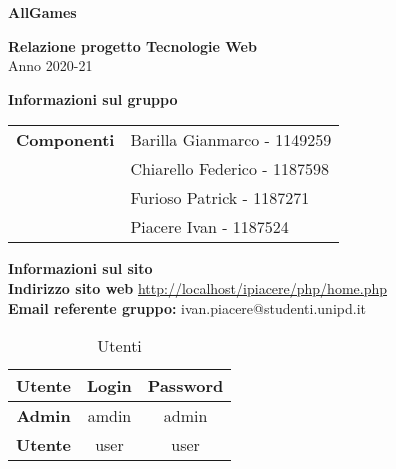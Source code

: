 \begin{center}
	\textbf{\Huge{AllGames}}\\
	\vspace{15pt}
\end{center}

\vspace{1.5cm}

\begin{center}
	\textbf{\huge{Relazione progetto Tecnologie Web}}\\[0.2cm]
	\Large{Anno 2020-21}
\end{center}

\vspace{5pt}

\begin{center}
	\textbf{\Large{Informazioni sul gruppo}}
\begin{table}[H]
	\hspace{3.5cm}
	\renewcommand{\arraystretch}{1.4}
	\begin{tabular}{l | l}
		\textbf{Componenti} & Barilla Gianmarco - 1149259\\
		& Chiarello Federico - 1187598\\
		& Furioso Patrick - 1187271\\
		& Piacere Ivan - 1187524\\
	\end{tabular}
\end{table}
\end{center}

\hspace{5pt}

\begin{center}
	\textbf{\Large{Informazioni sul sito}}\\
	\textbf{Indirizzo sito web} \url{http://localhost/ipiacere/php/home.php}\\
	\textbf{Email referente gruppo:} ivan.piacere@studenti.unipd.it
	\renewcommand{\arraystretch}{1.8}
	\begin{longtable}{c c c}
		\caption{Utenti}\\
		\rowcolor[HTML]{FF9933}
		\textbf{Utente} & \textbf{Login} & \textbf{Password} \\
		\endhead
		\textbf{Admin} & amdin & admin\\
		\textbf{Utente} & user & user\\
	\end{longtable}
\end{center}

